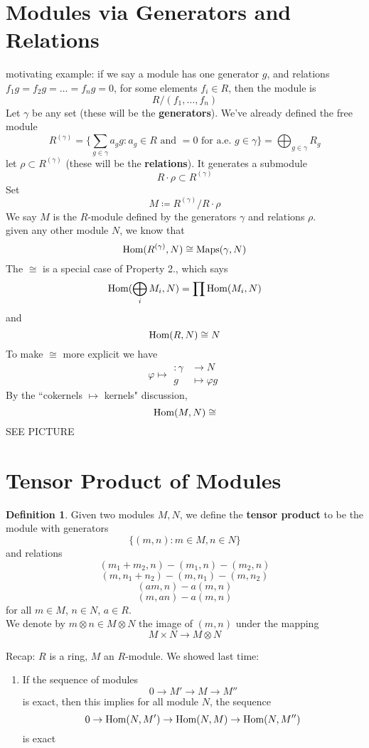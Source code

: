 \documentclass[12pt]{article}
\newcommand{\ho}[2]{\textup{Hom}(#1,#2)}
\newcommand{\mapping}[5]{\begin{align*}
#1\colon #2 &\to #3\\
#4 & \mapsto #5
\end{align*}}
\theoremstyle{definition}
\newtheorem{definition}[theorem]{Definition}
\begin{document}
\section*{Modules via Generators and Relations}
motivating example: if we say a module has one generator $g$, and relations $f_1g=f_2g = \dots = f_ng=0$, for some elements $f_i\in R$, then the module is
\[
R/(f_1,\dots,f_n)
\]
Let $\gamma$ be any set (these will be the \textbf{generators}). We've already defined the free module
\[
R^{(\gamma)} = \{\sum_{g\in \gamma} a_g g: a_g \in R\text{ and $=0$ for a.e. $g\in\gamma$} \} = \bigoplus_{g\in \gamma} R_g
\]
let $\rho \subset R^{(\gamma)}$ (these will be the \textbf{relations}). It generates a submodule
\[
R\cdot \rho \subset R^{(\gamma)}
\]
Set
\[
M\coloneqq R^{(\gamma)}/R\cdot \rho
\]
We say $M$ is the $R$-module defined by the generators $\gamma$ and relations $\rho$.\\
given any other module $N$, we know that 
\[
\ho{R^{(\gamma)}}{N} \cong \textup{Maps}(\gamma, N)
\]
The $\cong$ is a special case of Property 2., which says
\[
\ho{\bigoplus_i M_i}{N} = \prod \ho{M_i}{N}
\]
and 
\[
\ho{R}{N} \cong N
\]
To make $\cong $ more explicit we  have
\[
\varphi \mapsto \mapping{}{\gamma}{N}{g}{\varphi{g}}

\]
By the ``cokernels $\mapsto$ kernels" discussion,
\[
\ho{M}{N} \cong 
\]
SEE PICTURE

\section*{Tensor Product of Modules}
\begin{definition}
Given two modules $M,N$, we define the \textbf{tensor product} to be the module with generators 
\[
\{(m,n): m\in M,n\in N\}
\]
and relations
\[
(m_1+m_2,n) - (m_1,n)-(m_2,n)
\]
\[
(m, n_1+n_2) - (m,n_1)-(m,n_2)
\]
\[
(am,n)-a(m,n)
\]
\[
(m,an)-a(m,n)
\]
for all $m\in M$, $n\in N$, $a\in R$.\\
We denote by $m \otimes n \in M\otimes N$ the image of $(m,n)$ under the mapping
\[
M \times N \rightarrow M \otimes N
\]
\end{definition}
\date{09.10.2018}
Recap: $R$ is a ring, $M$ an $R$-module. We showed last time:
\begin{enumerate}
    \item If the sequence of modules
    \[
    0 \rightarrow M' \rightarrow M \rightarrow M''
    \]
    is exact, then this implies for all module $N$, the sequence
    \[
    0\rightarrow \ho{N}{M'}\rightarrow \ho{N}{M} \rightarrow \ho{N}{M''}
    \]
    is exact
    
\end{enumerate}
\end{document}
